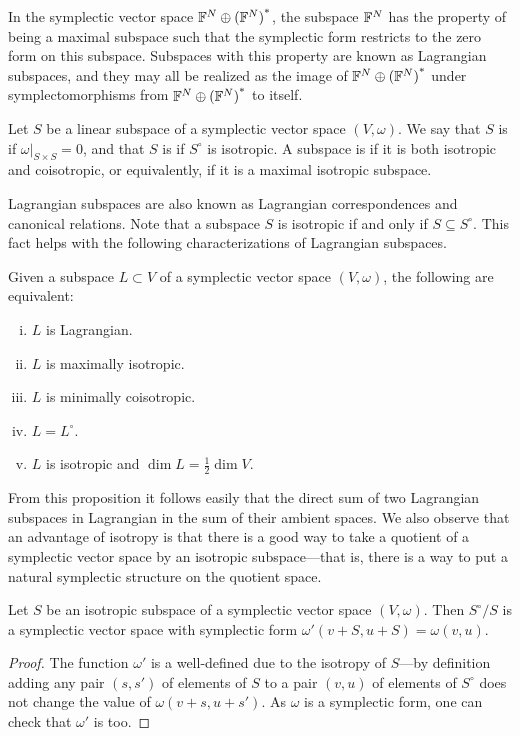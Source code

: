 In the symplectic vector space ${{\mathbb F}^{N} \oplus {({\mathbb F}^{N})}^\ast}$, the subspace ${\mathbb F}^N$ has the
property of being a maximal subspace such that the symplectic form restricts to
the zero form on this subspace. Subspaces with this property are known as Lagrangian
subspaces, and they may all be realized as the image of ${{\mathbb F}^{N} \oplus {({\mathbb F}^{N})}^\ast}$ 
under symplectomorphisms from ${{\mathbb F}^{N} \oplus {({\mathbb F}^{N})}^\ast}$ to itself.

\begin{definition} 
  Let $S$ be a linear subspace of a symplectic vector space $(V,\omega)$. We say
  that $S$ is  if $\omega|_{S \times S} = 0$, and that $S$ is
   if $S^\circ$ is isotropic. A subspace is
   if it is both isotropic and coisotropic, or equivalently, if it  
  is a maximal isotropic subspace.
\end{definition}

Lagrangian subspaces are also known as Lagrangian correspondences and canonical
relations. Note that a subspace $S$ is isotropic if and only if $S \subseteq
S^\circ$. This fact helps with the following characterizations of Lagrangian
subspaces.

\begin{proposition} \label{lagrangian_characterization} 
  Given a subspace $L \subset V$ of a symplectic vector space $(V,\omega)$, the
  following are equivalent: 
  \begin{enumerate}[(i)] 
    \item $L$ is Lagrangian.  
    \item $L$ is maximally isotropic.  
    \item $L$ is minimally coisotropic.  
    \item $L = L^\circ$.  
    \item $L$ is isotropic and $\dim L = \frac12 \dim V$.
  \end{enumerate} 
\end{proposition}

From this proposition it follows easily that the direct sum of two Lagrangian
subspaces in Lagrangian in the sum of their ambient spaces. We also observe that
an advantage of isotropy is that there is a good way to take a quotient of a
symplectic vector space by an isotropic subspace---that is, there is a way to
put a natural symplectic structure on the quotient space.

\begin{proposition}
  Let $S$ be an isotropic subspace of a symplectic vector space $(V,\omega)$.
  Then $S^\circ/S$ is a symplectic vector space with symplectic form
  $\omega'(v+S,u+S) = \omega(v,u)$.
\end{proposition}
\begin{proof} 
  The function $\omega'$ is a well-defined due to the isotropy of
  $S$---by definition adding any pair $(s,s')$ of elements of $S$ to a pair
  $(v,u)$ of elements of $S^\circ$ does not change the value of
  $\omega(v+s,u+s')$. As $\omega$ is a symplectic form, one can check that
  $\omega'$ is too.  
\end{proof}

